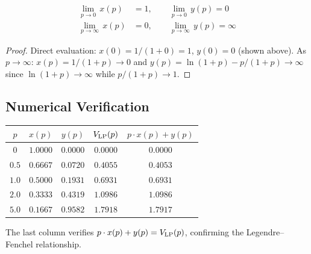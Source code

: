 \begin{lemma}\label{lem:boundaries}
\begin{align}
  \lim_{p \to 0}\, x(p) &= 1, \qquad \lim_{p \to 0}\, y(p) = 0 \label{eq:boundary-zero}\\
  \lim_{p \to \infty}\, x(p) &= 0, \qquad \lim_{p \to \infty}\, y(p) = \infty \label{eq:boundary-inf}
\end{align}
\end{lemma}

\begin{proof}
Direct evaluation: $x(0) = 1/(1+0) = 1$, $y(0) = 0$ (shown above).
As $p \to \infty$: $x(p) = 1/(1+p) \to 0$ and $y(p) = \ln(1+p) - p/(1+p) \to \infty$
since $\ln(1+p) \to \infty$ while $p/(1+p) \to 1$. \qedhere
\end{proof}

\subsection{Numerical Verification}

\begin{center}
\begin{tabular}{@{}ccccc@{}}
\toprule
$p$ & $x(p)$ & $y(p)$ & $V_{\mathrm{LP}}(p)$ & $p \cdot x(p) + y(p)$ \\
\midrule
$0$   & $1.0000$ & $0.0000$ & $0.0000$ & $0.0000$ \\
$0.5$ & $0.6667$ & $0.0720$ & $0.4055$ & $0.4053$ \\
$1.0$ & $0.5000$ & $0.1931$ & $0.6931$ & $0.6931$ \\
$2.0$ & $0.3333$ & $0.4319$ & $1.0986$ & $1.0986$ \\
$5.0$ & $0.1667$ & $0.9582$ & $1.7918$ & $1.7917$ \\
\bottomrule
\end{tabular}
\end{center}

The last column verifies $p \cdot x(p) + y(p) = V_{\mathrm{LP}}(p)$, confirming the
Legendre--Fenchel relationship.
